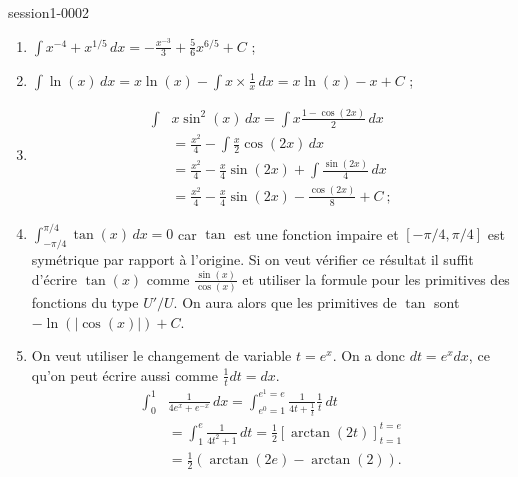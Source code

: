 
\begin{corrige}{session1-0002}

  \begin{enumerate}
  \item $\displaystyle \int x^{-4} + x^{1/5}\, dx = -\frac{x^{-3}}{3} + \frac{5}{6}x^{6/5} +C $ ;
  \item $\displaystyle \int \ln(x)\, dx = x\ln(x) - \int x\times \frac{1}{x}\, dx = x\ln(x) -x +C$ ;
  \item
    \begin{equation*}
      \begin{aligned}
        \int & x\sin^2(x)\, dx = \int x\frac{1 - \cos(2x)}{2} \,dx \\
        &= \frac{x^2}{4} - \int \frac{x}{2}\cos\left(2x\right) \, dx \\
        &= \frac{x^2}{4} - \frac{x}{4}\sin\left(2x\right) + \int \frac{\sin\left(2x\right)}{4}\, dx \\
        &= \frac{x^2}{4} - \frac{x}{4}\sin\left(2x\right) - \frac{\cos\left(2x\right)}{8}+ C \:;
      \end{aligned}
    \end{equation*}
    \item $\displaystyle \int_{-\pi/4}^{\pi/4}\tan(x)\, dx = 0$ car $\tan$ est une fonction impaire et $[-\pi/4, \pi/4]$ est sym\'etrique par rapport \`a l'origine. Si on veut v\'erifier ce r\'esultat il suffit d'\'ecrire $\tan(x)$ comme $\frac{\sin(x)}{\cos(x)}$ et utiliser la formule pour les primitives des fonctions du type $U'/U$. On aura alors que les primitives de $\tan$ sont $-\ln(|\cos(x)|) + C$.  
  \item  On veut utiliser le changement de variable $t = e^x$. On a donc $dt = e^x dx$, ce qu'on peut \'ecrire aussi comme $\frac{1}{t}dt = dx$.    
    \begin{equation*}
      \begin{aligned}
        \int_{0}^{1}&\frac{1}{4e^x+e^{-x} }\, dx = \int_{e^0=1}^{e^1 =e} \frac{1}{4t + \frac{1}{t}} \frac{1}{t} \,dt\\
        & = \int_1^e \frac{1}{4t^2 +1} \, dt =\frac{1}{2}\left[\arctan(2t)\right]_{t=1}^{t=e} \\
        &= \frac{1}{2}\left(\arctan(2e)-\arctan(2)\right).
      \end{aligned}
    \end{equation*}

\end{enumerate}
\end{corrige}
